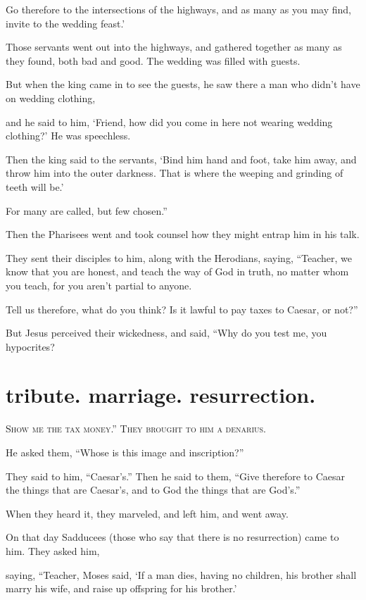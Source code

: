 Go therefore to the intersections of the highways, and as many as you may find, invite to the wedding feast.’

Those servants went out into the highways, and gathered together as many as they found, both bad and good. The wedding was filled with guests.

But when the king came in to see the guests, he saw there a man who didn’t have on wedding clothing,

and he said to him, ‘Friend, how did you come in here not wearing wedding clothing?’ He was speechless.

Then the king said to the servants, ‘Bind him hand and foot, take him away, and throw him into the outer darkness. That is where the weeping and grinding of teeth will be.’

For many are called, but few chosen.”

Then the Pharisees went and took counsel how they might entrap him in his talk.

They sent their disciples to him, along with the Herodians, saying, “Teacher, we know that you are honest, and teach the way of God in truth, no matter whom you teach, for you aren’t partial to anyone.

Tell us therefore, what do you think? Is it lawful to pay taxes to Caesar, or not?”

But Jesus perceived their wickedness, and said, “Why do you test me, you hypocrites?


\clearpage \section*{tribute. marriage. resurrection.}

\lettrine{S}{how me the tax money.” They brought to him a denarius.}

He asked them, “Whose is this image and inscription?”

They said to him, “Caesar’s.” Then he said to them, “Give therefore to Caesar the things that are Caesar’s, and to God the things that are God’s.”

When they heard it, they marveled, and left him, and went away.

On that day Sadducees (those who say that there is no resurrection) came to him. They asked him,

saying, “Teacher, Moses said, ‘If a man dies, having no children, his brother shall marry his wife, and raise up offspring for his brother.’

